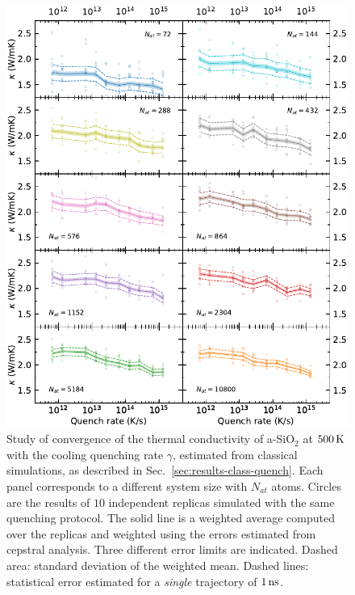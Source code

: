 \begin{figure}[!tb]
    \centering
    \includegraphics[width=\textwidth]{chapters/chapter6/figures/Silica_NVT_kappa_QTIMEconv_tesi.pdf}
    \caption{Study of convergence of the thermal conductivity of a-SiO$_2$ at $500\,\mathrm{K}$ with the cooling quenching rate $\gamma$, estimated from classical simulations, as described in Sec.~\ref{sec:results-class-quench}. 
    Each panel corresponds to a different system size with $N_{at}$ atoms.
    Circles are the results of $10$ independent replicas simulated with the same quenching protocol. The solid line is a weighted average computed over the replicas and weighted using the errors estimated from cepstral analysis. Three different error limits are indicated. 
    Dashed area: standard deviation of the weighted mean. 
    Dashed lines: statistical error estimated for a \emph{single} trajectory of $1\,\mathrm{ns}$. 
    }
    \label{fig:results-class-kappa-vs-quench}
\end{figure}

